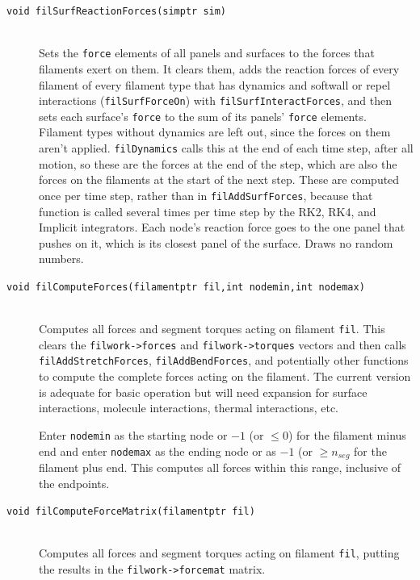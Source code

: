 \documentclass {scrbook}
\newcommand {\ttt} {\texttt}
\begin{document}
\begin{description}
\item[\ttt{void filSurfReactionForces(simptr sim)}] %
\hfill \\
Sets the \ttt{force} elements of all panels and surfaces to the forces that filaments exert on them. It clears them, adds the reaction forces of every filament of every filament type that has dynamics and softwall or repel interactions (\ttt{filSurfForceOn}) with \ttt{filSurfInteractForces}, and then sets each surface's \ttt{force} to the sum of its panels' \ttt{force} elements. Filament types without dynamics are left out, since the forces on them aren't applied. \ttt{filDynamics} calls this at the end of each time step, after all motion, so these are the forces at the end of the step, which are also the forces on the filaments at the start of the next step. These are computed once per time step, rather than in \ttt{filAddSurfForces}, because that function is called several times per time step by the RK2, RK4, and Implicit integrators. Each node's reaction force goes to the one panel that pushes on it, which is its closest panel of the surface. Draws no random numbers.

\item[\ttt{void filComputeForces(filamentptr fil,int nodemin,int nodemax)}]
\hfill \\
Computes all forces and segment torques acting on filament \ttt{fil}. This clears the \ttt{filwork->forces} and \ttt{filwork->torques} vectors and then calls \ttt{filAddStretchForces}, \ttt{filAddBendForces}, and potentially other functions to compute the complete forces acting on the filament. The current version is adequate for basic operation but will need expansion for surface interactions, molecule interactions, thermal interactions, etc.

Enter \ttt{nodemin} as the starting node or $-1$ (or $\leq 0$) for the filament minus end and enter \ttt{nodemax} as the ending node or as $-1$ (or $\geq n_{seg}$ for the filament plus end. This computes all forces within this range, inclusive of the endpoints.


\item[\ttt{void filComputeForceMatrix(filamentptr fil)}]
\hfill \\
Computes all forces and segment torques acting on filament \ttt{fil}, putting the results in the \ttt{filwork->forcemat} matrix.


\end{description}
\end{document}
